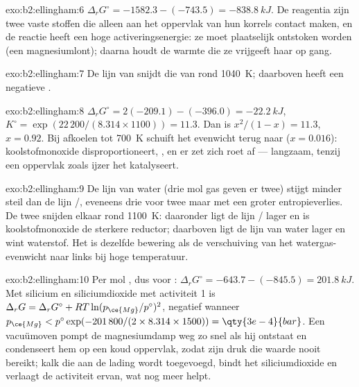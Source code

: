 \begin{solution}{exo:b2:ellingham:6}
$\Delta_r G^\circ = -1582.3 - (-743.5) = \qty{-838.8}{kJ}$. De reagentia zijn
twee vaste stoffen die alleen aan het oppervlak van hun korrels contact maken, en de reactie
heeft een hoge activeringsenergie: ze moet plaatselijk ontstoken worden (een magnesiumlont);
daarna houdt de warmte die ze vrijgeeft haar op gang.
\end{solution}

\begin{solution}{exo:b2:ellingham:7}
De lijn van  snijdt die van  rond
\qty{1040}{K}; daarboven heeft  een negatieve
.
\end{solution}

\begin{solution}{exo:b2:ellingham:8}
$\Delta_r G^\circ = 2(-209.1) - (-396.0) = \qty{-22.2}{kJ}$, $K^\circ =
\exp(22\,200/(8.314 \times 1100)) = 11.3$. Dan is $x^2/(1 - x) = 11.3$, $x =
0.92$. Bij afkoelen tot \qty{700}{K} schuift het evenwicht terug naar 
($x = 0.016$): koolstofmonoxide disproportioneert, , en
er zet zich roet af --- langzaam, tenzij een oppervlak zoals ijzer het katalyseert.
\end{solution}

\begin{solution}{exo:b2:ellingham:9}
De lijn van water (drie mol gas geven er twee) stijgt minder steil dan de
lijn /, eveneens drie voor twee maar met een groter entropieverlies. De
twee snijden elkaar rond \qty{1100}{K}: daaronder ligt de lijn / lager en
is koolstofmonoxide de sterkere reductor; daarboven ligt de lijn van water lager en
wint waterstof. Het is dezelfde bewering als de verschuiving van het watergas-evenwicht
 naar links bij hoge temperatuur.
\end{solution}

\begin{solution}{exo:b2:ellingham:10}
Per mol , dus voor : $\Delta_r
G^\circ = -643.7 - (-845.5) = \qty{+201.8}{kJ}$. Met silicium en siliciumdioxide met
activiteit 1 is $\Delta_r G = \Delta_r G^\circ + RT\ln(p_{\ce{Mg}}/p^\circ)^2$, negatief
wanneer $p_{\ce{Mg}} < p^\circ\exp(-201\,800/(2 \times 8.314 \times 1500)) =
\qty{3e-4}{bar}$. Een vacuümoven pompt de magnesiumdamp weg zo snel
als hij ontstaat en condenseert hem op een koud oppervlak, zodat zijn druk die waarde
nooit bereikt; kalk die aan de lading wordt toegevoegd, bindt het siliciumdioxide en verlaagt de activiteit ervan,
wat nog meer helpt.
\end{solution}

